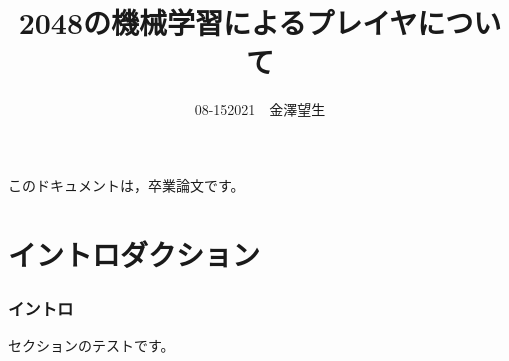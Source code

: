 \documentclass[a4paper]{jsarticle}
\title{2048の機械学習によるプレイヤについて}
\author{08-152021　金澤望生}
\begin{document}
\maketitle

このドキュメントは，卒業論文です。

\part{イントロダクション}
\section{イントロ}
セクションのテストです。
\end{document}
